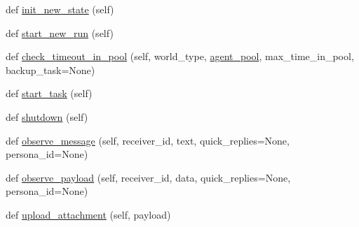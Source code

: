 \begin{DoxyCompactItemize}
\item 
def \hyperlink{classparlai_1_1chat__service_1_1services_1_1messenger_1_1messenger__manager_1_1MessengerManager_a172def2db5fc015d16f37baca685267c}{init\+\_\+new\+\_\+state} (self)
\item 
def \hyperlink{classparlai_1_1chat__service_1_1services_1_1messenger_1_1messenger__manager_1_1MessengerManager_a76e86a89a5cbcdf013023f06b119039e}{start\+\_\+new\+\_\+run} (self)
\item 
def \hyperlink{classparlai_1_1chat__service_1_1services_1_1messenger_1_1messenger__manager_1_1MessengerManager_ace19c32e618503b0b750f3e0a5641f4d}{check\+\_\+timeout\+\_\+in\+\_\+pool} (self, world\+\_\+type, \hyperlink{classparlai_1_1chat__service_1_1services_1_1messenger_1_1messenger__manager_1_1MessengerManager_aa8ec05fd465ab10f6516922b9e4e27ca}{agent\+\_\+pool}, max\+\_\+time\+\_\+in\+\_\+pool, backup\+\_\+task=None)
\item 
def \hyperlink{classparlai_1_1chat__service_1_1services_1_1messenger_1_1messenger__manager_1_1MessengerManager_a6bd1cf187d6a26e57b22e11800734734}{start\+\_\+task} (self)
\item 
def \hyperlink{classparlai_1_1chat__service_1_1services_1_1messenger_1_1messenger__manager_1_1MessengerManager_ab6879d8a8fd1f897cf3dba904a11c4c0}{shutdown} (self)
\item 
def \hyperlink{classparlai_1_1chat__service_1_1services_1_1messenger_1_1messenger__manager_1_1MessengerManager_ab951bfae1eeb05f42e9fa215b2d019a7}{observe\+\_\+message} (self, receiver\+\_\+id, text, quick\+\_\+replies=None, persona\+\_\+id=None)
\item 
def \hyperlink{classparlai_1_1chat__service_1_1services_1_1messenger_1_1messenger__manager_1_1MessengerManager_ad969bb72a7095bde4f48be0a403e9471}{observe\+\_\+payload} (self, receiver\+\_\+id, data, quick\+\_\+replies=None, persona\+\_\+id=None)
\item 
def \hyperlink{classparlai_1_1chat__service_1_1services_1_1messenger_1_1messenger__manager_1_1MessengerManager_a64b1a7241aecdca1d321efa92134ff96}{upload\+\_\+attachment} (self, payload)
\end{DoxyCompactItemize}
